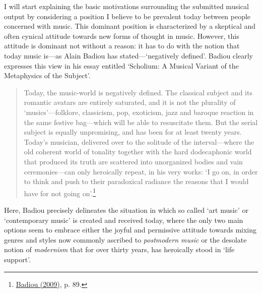 I will start explaining the basic motivations surrounding the submitted musical output by considering a position I believe to be prevalent today between people concerned with music. This dominant position is characterized by a skeptical and often cynical attitude towards new forms of thought in music. However, this attitude is dominant not without a reason: it has to do with the notion that today music is---as Alain Badiou has stated---`negatively defined'. Badiou clearly expresses this view in his essay entitled `Scholium: A Musical Variant of the Metaphysics of the Subject'.
\begin{quote}
Today, the music-world is negatively defined. The classical subject and its romantic avatars are entirely saturated, and it is not the plurality of `musics'---folklore, classicism, pop, exoticism, jazz and baroque reaction in the same festive bag---which will be able to resuscitate them. But the serial subject is equally unpromising, and has been for at least twenty years. Today's  musician, delivered over to the solitude of the interval---where the old coherent world of tonality together with the hard dodecaphonic world that produced its truth are scattered into unorganized bodies and vain ceremonies---can only heroically repeat, in his very works: `I go on, in order to think and push to their paradoxical radiance the reasons that I would have for not going on'.\footnote{\hyperlink{badioumus}{Badiou (2009)}, p. 89.} 
\end{quote}
Here, Badiou precisely delineates the situation in which so called `art music' or `contemporary music' is created and received today, where the only two main options seem to embrace either the joyful and permissive attitude towards mixing genres and styles now commonly ascribed to \emph{postmodern music} or the desolate notion of \emph{modernism} that for over thirty years, has heroically stood in `life support'. 

